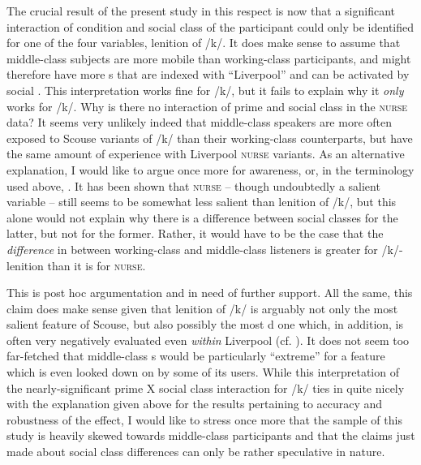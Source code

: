 The crucial result of the present study in this respect is now that a significant interaction of  condition and social class of the participant could only be identified for one of the four variables, lenition of /k/.
It does make sense to assume that middle-class subjects are more mobile than working-class participants, and might therefore have more s that are indexed with ``Liverpool'' and can be activated by social .
This interpretation works fine for /k/, but it fails to explain why it \emph{only} works for /k/.
Why is there no interaction of prime and social class in the \textsc{nurse} data?
It seems very unlikely indeed that middle-class speakers are more often exposed to Scouse variants of /k/ than their working-class counterparts, but have the same amount of experience with Liverpool \textsc{nurse} variants.
As an alternative explanation, I would like to argue once more for awareness, or, in the terminology used above, .
It has been shown that \textsc{nurse} -- though undoubtedly a salient variable -- still seems to be somewhat less salient than lenition of /k/, but this alone would not explain why there is a difference between social classes for the latter, but not for the former.
Rather, it would have to be the case that the \emph{difference} in  between working-class and middle-class listeners is greater for /k/-lenition than it is for \textsc{nurse}.

This is post hoc argumentation and in need of further support.
All the same, this claim does make sense given that lenition of /k/ is arguably not only the most salient feature of Scouse, but also possibly the most d one which, in addition, is often very negatively evaluated even \emph{within} Liverpool (cf. ).
It does not seem too far-fetched that middle-class s would be particularly ``extreme'' for a feature which is even looked down on by some of its users.
While this interpretation of the nearly-significant prime X social class interaction for /k/ ties in quite nicely with the explanation given above for the results pertaining to accuracy and robustness of the  effect, I would like to stress once more that the sample of this study is heavily skewed towards middle-class participants and that the claims just made about social class differences can only be rather speculative in nature.

